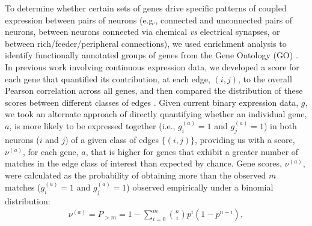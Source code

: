 \documentclass[10pt,letterpaper]{article}
\begin{document}
To determine whether certain sets of genes drive specific patterns of coupled expression between pairs of neurons (e.g., connected and unconnected pairs of neurons, between neurons connected via chemical \textit{vs} electrical synapses, or between rich/feeder/peripheral connections), we used enrichment analysis to identify functionally annotated groups of genes from the Gene Ontology (GO) \cite{Ashburner2000}.
In previous work involving continuous expression data, we developed a score for each gene that quantified its contribution, at each edge, $(i,j)$, to the overall Pearson correlation across all genes, and then compared the distribution of these scores between different classes of edges \cite{Fulcher:2016ck}.
Given current binary expression data, $g$, we took an alternate approach of directly quantifying whether an individual gene, $a$, is more likely to be expressed together (i.e., $g^{(a)}_i = 1$ and $g^{(a)}_j = 1$) in both neurons ($i$ and $j$) of a given class of edges $\{(i,j)\}$, providing us with a score, $\nu^{(a)}$, for each gene, $a$, that is higher for genes that exhibit a greater number of matches in the edge class of interest than expected by chance.
Gene scores, $\nu^{(a)}$, were calculated as the probability of obtaining more than the observed $m$ matches ($g^{(a)}_i = 1$ and $g^{(a)}_j = 1$) observed empirically under a binomial distribution:
\begin{eqnarray}
	\label{eq:CBinomialProbability}
     \nu^{(a)} = P_{>m} = 1 - \sum_{i=0}^{m}\binom{n}{i} p^{i}(1-p^{n-i}),
\end{eqnarray}
\end{document}
